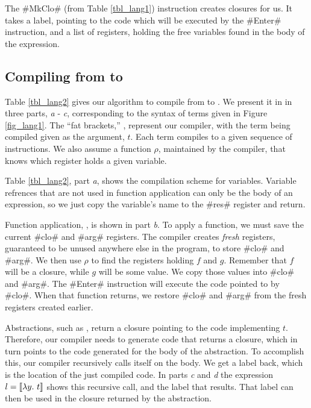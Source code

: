 \documentclass[12pt]{report}
\begin{document}
The #MkClo# (from Table \ref{tbl_lang1}) instruction creates closures
for us. It takes a label, pointing to the code which will be executed
by the #Enter# instruction, and a list of registers, holding the free
variables found in the body of the expression.

\subsection{Compiling from \lamA to \machLam}

Table \ref{tbl_lang2} gives our algorithm to compile from \lamA to
\machLam. We present it in in three parts, \emph{a} - \emph{c},
corresponding to the syntax of \lamA terms given in Figure
\ref{fig_lang1}. The ``fat brackets,'' , represent our
compiler, with the term being compiled given as the argument, $t$.
Each term compiles to a given sequence of instructions. We also assume
a function $\rho$, maintained by the compiler, that knows which
register holds a given variable.

\afterpage{\clearpage{}\clearpage}

Table \ref{tbl_lang2}, part \emph{a}, shows the compilation
scheme for variables. Variable refrences that are not used
in function application can only be the body of an expression, so we
just copy the variable's name to the #res#
register and return.

Function application, , is shown in part
\emph{b}. To apply a function, we must save the current #clo#
and #arg# registers. The compiler creates \emph{fresh} registers,
guaranteed to be unused anywhere else in the program, to store #clo#
and #arg#. We then use $\rho$ to find the registers holding $f$ and
$g$. Remember that $f$ will be a closure, while $g$ will be some
value. We copy those values into #clo# and #arg#. The #Enter#
instruction will execute the code pointed to by #clo#. When that
function returns, we restore #clo# and #arg# from the fresh registers
created earlier.

Abstractions, such as , return a closure pointing to the
code implementing $t$. Therefore, our compiler needs to generate code
that returns a closure, which in turn points to the code generated for
the body of the abstraction. To accomplish this, our compiler
recursively calls itself on the body. We get a label back, which is the
location of the just compiled code. In parts \emph{c} and \emph{d}
the expression $l = \llbracket \lambda y.\ t \rrbracket$ shows this
recursive call, and the label that results. That label can then be used in the 
closure returned by the abstraction.
\end{document}
